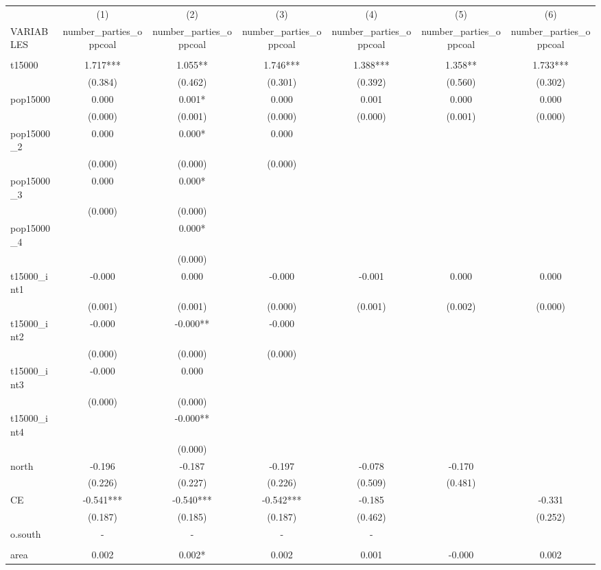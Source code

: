 \documentclass[]{article}
\begin{document}
\begin{tabular}{lcccccc} \hline
 & (1) & (2) & (3) & (4) & (5) & (6) \\
VARIABLES & number\_parties\_oppcoal & number\_parties\_oppcoal & number\_parties\_oppcoal & number\_parties\_oppcoal & number\_parties\_oppcoal & number\_parties\_oppcoal \\ \hline
 &  &  &  &  &  &  \\
t15000 & 1.717*** & 1.055** & 1.746*** & 1.388*** & 1.358** & 1.733*** \\
 & (0.384) & (0.462) & (0.301) & (0.392) & (0.560) & (0.302) \\
pop15000 & 0.000 & 0.001* & 0.000 & 0.001 & 0.000 & 0.000 \\
 & (0.000) & (0.001) & (0.000) & (0.000) & (0.001) & (0.000) \\
pop15000\_2 & 0.000 & 0.000* & 0.000 &  &  &  \\
 & (0.000) & (0.000) & (0.000) &  &  &  \\
pop15000\_3 & 0.000 & 0.000* &  &  &  &  \\
 & (0.000) & (0.000) &  &  &  &  \\
pop15000\_4 &  & 0.000* &  &  &  &  \\
 &  & (0.000) &  &  &  &  \\
t15000\_int1 & -0.000 & 0.000 & -0.000 & -0.001 & 0.000 & 0.000 \\
 & (0.001) & (0.001) & (0.000) & (0.001) & (0.002) & (0.000) \\
t15000\_int2 & -0.000 & -0.000** & -0.000 &  &  &  \\
 & (0.000) & (0.000) & (0.000) &  &  &  \\
t15000\_int3 & -0.000 & 0.000 &  &  &  &  \\
 & (0.000) & (0.000) &  &  &  &  \\
t15000\_int4 &  & -0.000** &  &  &  &  \\
 &  & (0.000) &  &  &  &  \\
north & -0.196 & -0.187 & -0.197 & -0.078 & -0.170 &  \\
 & (0.226) & (0.227) & (0.226) & (0.509) & (0.481) &  \\
CE & -0.541*** & -0.540*** & -0.542*** & -0.185 &  & -0.331 \\
 & (0.187) & (0.185) & (0.187) & (0.462) &  & (0.252) \\
o.south & - & - & - & - &  &  \\
 &  &  &  &  &  &  \\
area & 0.002 & 0.002* & 0.002 & 0.001 & -0.000 & 0.002 \\

\end{tabular}
\end{document}
